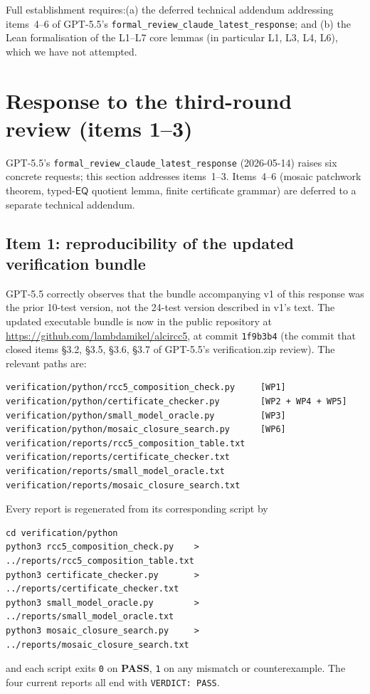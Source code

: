 \documentclass[11pt]{article}
\newcommand{\EQ}{\mathsf{EQ}}
\newcommand{\PASS}{\textcolor{black!70!green}{\textbf{PASS}}}
\begin{document}
Full establishment requires:\@ (a) the deferred technical addendum
addressing items~4--6 of GPT-5.5's
\texttt{formal\_review\_claude\_latest\_response}; and (b) the
Lean formalisation of the L1--L7 core lemmas (in particular L1,
L3, L4, L6), which we have not attempted.

\section{Response to the third-round review (items 1--3)}
\label{sec:thirdround}

GPT-5.5's
\texttt{formal\_review\_claude\_latest\_response} (2026-05-14)
raises six concrete requests; this section addresses items~1--3.
Items~4--6 (mosaic patchwork theorem, typed-\(\EQ\) quotient
lemma, finite certificate grammar) are deferred to a separate
technical addendum.

\subsection{Item 1: reproducibility of the updated verification bundle}
\label{sec:reproducibility}

GPT-5.5 correctly observes that the bundle accompanying v1 of this
response was the prior 10-test version, not the 24-test version
described in v1's text.  The updated executable bundle is now in
the public repository at \url{https://github.com/lambdamikel/alcircc5},
at commit \texttt{1f9b3b4} (the commit that closed items \S3.2,
\S3.5, \S3.6, \S3.7 of GPT-5.5's verification.zip review).  The
relevant paths are:

\begin{lstlisting}
verification/python/rcc5_composition_check.py     [WP1]
verification/python/certificate_checker.py        [WP2 + WP4 + WP5]
verification/python/small_model_oracle.py         [WP3]
verification/python/mosaic_closure_search.py      [WP6]
verification/reports/rcc5_composition_table.txt
verification/reports/certificate_checker.txt
verification/reports/small_model_oracle.txt
verification/reports/mosaic_closure_search.txt
\end{lstlisting}

\noindent
Every report is regenerated from its corresponding script by
\begin{lstlisting}
cd verification/python
python3 rcc5_composition_check.py    > ../reports/rcc5_composition_table.txt
python3 certificate_checker.py       > ../reports/certificate_checker.txt
python3 small_model_oracle.py        > ../reports/small_model_oracle.txt
python3 mosaic_closure_search.py     > ../reports/mosaic_closure_search.txt
\end{lstlisting}
\noindent
and each script exits \texttt{0} on \PASS, \texttt{1} on any
mismatch or counterexample.  The four current reports all end with
\texttt{VERDICT: PASS}.
\end{document}

